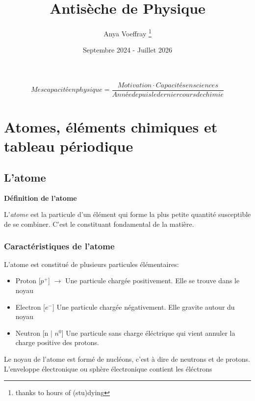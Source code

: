 \documentclass{article}
\title{Antisèche de Physique}
\author{Anya Voeffray \thanks{thanks to hours of (stu)dying}}
\date{Septembre 2024 - Juillet 2026}
\begin{document}
\begin{titlepage}
\maketitle

\begin{equation}
  Mes capacité en physique = \frac{Motivation \cdot Capacités en sciences}{Année depuis le dernier cours de chimie}
\end{equation}

\end{titlepage}


\section{Atomes, éléments chimiques et tableau périodique}

\subsection{L'atome}

\textbf{Définition de l'atome}

L'\textit{atome} est la particule d'un élément qui forme la plus petite quantité susceptible de se combiner.
C'est le constituant fondamental de la matière. 

\subsubsection{Caractéristiques de l'atome}

L'atome est constitué de plusieurs particules élémentaires:

\begin{itemize}
  \item Proton [$p^+$] $\rightarrow$ Une particule chargée positivement. Elle se trouve dans le noyau
  \item Electron [$e^-$] \rightarrow Une particule chargée négativement. Elle gravite autour du noyau
  \item Neutron [n | $n^0$] \rightarrow Une particule sans charge éléctrique qui vient annuler la charge positive des protons.
\end{itemize}

Le noyau de l'atome est formé de nucléons, c'est à dire de neutrons et de protons.
L'enveloppe électronique ou sphère électronique contient les éléctrons
\end{document}
